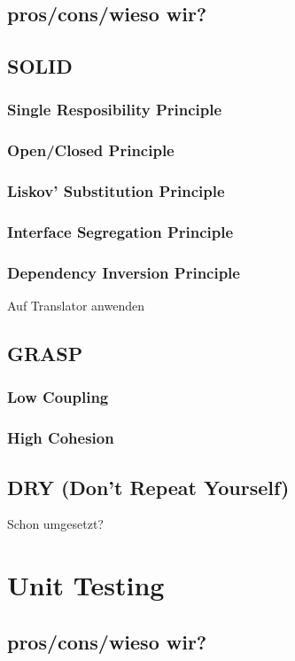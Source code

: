 \documentclass{article}
\begin{document}
\subsection{pros/cons/wieso wir?}
\subsection{SOLID}
\subsubsection{Single Resposibility Principle}
\subsubsection{Open/Closed Principle}
\subsubsection{Liskov' Substitution Principle}
\subsubsection{Interface Segregation Principle}
\subsubsection{Dependency Inversion Principle}
Auf Translator anwenden
\subsection{GRASP}
\subsubsection{Low Coupling}
\subsubsection{High Cohesion}
\subsection{DRY (Don't Repeat Yourself)}
Schon umgesetzt?


\section{Unit Testing}
\subsection{pros/cons/wieso wir?}
\end{document}
